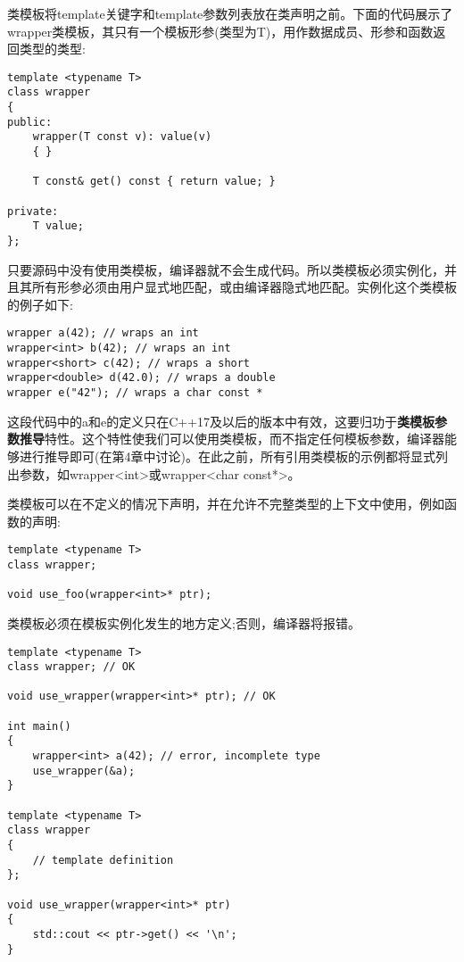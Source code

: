 类模板将template关键字和template参数列表放在类声明之前。下面的代码展示了wrapper类模板，其只有一个模板形参(类型为T)，用作数据成员、形参和函数返回类型的类型:

\begin{lstlisting}[style=styleCXX]
template <typename T>
class wrapper
{
public:
	wrapper(T const v): value(v)
	{ }
	
	T const& get() const { return value; }
	
private:
	T value;
};
\end{lstlisting}

只要源码中没有使用类模板，编译器就不会生成代码。所以类模板必须实例化，并且其所有形参必须由用户显式地匹配，或由编译器隐式地匹配。实例化这个类模板的例子如下:

\begin{lstlisting}[style=styleCXX]
wrapper a(42); // wraps an int
wrapper<int> b(42); // wraps an int
wrapper<short> c(42); // wraps a short
wrapper<double> d(42.0); // wraps a double
wrapper e("42"); // wraps a char const *
\end{lstlisting}

这段代码中的a和e的定义只在C++17及以后的版本中有效，这要归功于\textbf{类模板参数推导}特性。这个特性使我们可以使用类模板，而不指定任何模板参数，编译器能够进行推导即可(在第4章中讨论)。在此之前，所有引用类模板的示例都将显式列出参数，如wrapper<int>或wrapper<char const*>。

类模板可以在不定义的情况下声明，并在允许不完整类型的上下文中使用，例如函数的声明:

\begin{lstlisting}[style=styleCXX]
template <typename T>
class wrapper;

void use_foo(wrapper<int>* ptr);
\end{lstlisting}

类模板必须在模板实例化发生的地方定义;否则，编译器将报错。

\begin{lstlisting}[style=styleCXX]
template <typename T>
class wrapper; // OK

void use_wrapper(wrapper<int>* ptr); // OK

int main()
{
	wrapper<int> a(42); // error, incomplete type
	use_wrapper(&a);
}

template <typename T>
class wrapper
{
	// template definition
};

void use_wrapper(wrapper<int>* ptr)
{
	std::cout << ptr->get() << '\n';
}
\end{lstlisting}

